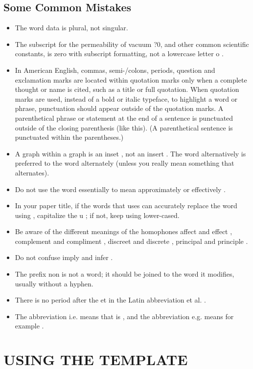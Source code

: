 \documentclass[letterpaper, 10 pt, conference]{ieeeconf}  %
\begin{document}
\subsection{Some Common Mistakes}
\begin{itemize}


\item The word  data  is plural, not singular.
\item The subscript for the permeability of vacuum ?0, and other common scientific constants, is zero with subscript formatting, not a lowercase letter  o .
\item In American English, commas, semi-/colons, periods, question and exclamation marks are located within quotation marks only when a complete thought or name is cited, such as a title or full quotation. When quotation marks are used, instead of a bold or italic typeface, to highlight a word or phrase, punctuation should appear outside of the quotation marks. A parenthetical phrase or statement at the end of a sentence is punctuated outside of the closing parenthesis (like this). (A parenthetical sentence is punctuated within the parentheses.)
\item A graph within a graph is an  inset , not an  insert . The word alternatively is preferred to the word  alternately  (unless you really mean something that alternates).
\item Do not use the word  essentially  to mean  approximately  or  effectively .
\item In your paper title, if the words  that uses  can accurately replace the word  using , capitalize the  u ; if not, keep using lower-cased.
\item Be aware of the different meanings of the homophones  affect  and  effect ,  complement  and  compliment ,  discreet  and  discrete ,  principal  and  principle .
\item Do not confuse  imply  and  infer .
\item The prefix  non  is not a word; it should be joined to the word it modifies, usually without a hyphen.
\item There is no period after the  et  in the Latin abbreviation  et al. .
\item The abbreviation  i.e.  means  that is , and the abbreviation  e.g.  means  for example .

\end{itemize}


\section{USING THE TEMPLATE}
\end{document}

